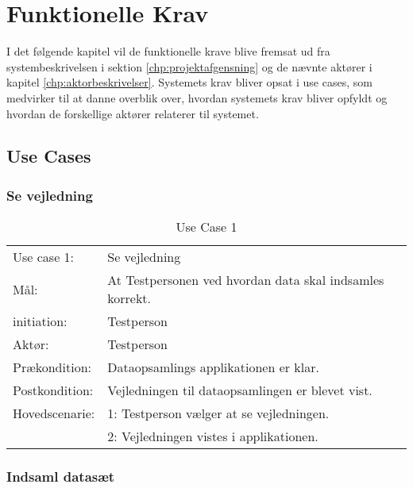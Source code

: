 \chapter{Funktionelle Krav}
\label{chp:funktionellen}
I det følgende kapitel vil de funktionelle krave blive fremsat ud fra systembeskrivelsen i sektion \ref{chp:projektafgensning} og de nævnte aktører i kapitel \ref{chp:aktorbeskrivelser}. Systemets krav bliver opsat i use cases, som medvirker til at danne overblik over, hvordan systemets krav bliver opfyldt og hvordan de forskellige aktører relaterer til systemet.
\section{Use Cases}

\subsection{Se vejledning}
\bgroup
\def\arraystretch{1.8}
\begin{center}
	\begin{table}[htbp]
		\begin{tabular}{lp{274pt}}
			\rowcolor{grey} Use case 1:	& Se vejledning \\
			Mål:	& At Testpersonen ved hvordan data skal indsamles korrekt. \\
			initiation:	& Testperson\\
			Aktør: & Testperson\\
			Prækondition: & Dataopsamlings applikationen er klar.\\
			Postkondition: & Vejledningen til dataopsamlingen er blevet vist.\\
			Hovedscenarie: & 1: Testperson vælger at se vejledningen.\\
			& 2: Vejledningen vistes i applikationen.\\
		\end{tabular}
		\caption{Use Case 1}
	\end{table}
\end{center}
\newpage
\subsection{Indsaml datasæt}

